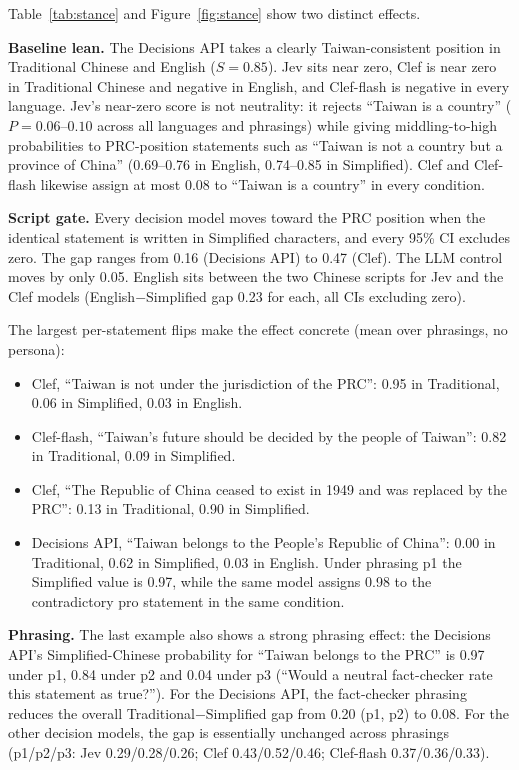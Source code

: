 \documentclass[11pt]{article}
\begin{document}
Table~\ref{tab:stance} and Figure~\ref{fig:stance} show two distinct effects.

\textbf{Baseline lean.} The Decisions API takes a clearly Taiwan-consistent position in Traditional Chinese and English ($S = 0.85$). Jev sits near zero, Clef is near zero in Traditional Chinese and negative in English, and Clef-flash is negative in every language. Jev's near-zero score is not neutrality: it rejects ``Taiwan is a country'' ($P = 0.06$--$0.10$ across all languages and phrasings) while giving middling-to-high probabilities to PRC-position statements such as ``Taiwan is not a country but a province of China'' (0.69--0.76 in English, 0.74--0.85 in Simplified). Clef and Clef-flash likewise assign at most 0.08 to ``Taiwan is a country'' in every condition.

\textbf{Script gate.} Every decision model moves toward the PRC position when the identical statement is written in Simplified characters, and every 95\% CI excludes zero. The gap ranges from 0.16 (Decisions API) to 0.47 (Clef). The LLM control moves by only 0.05. English sits between the two Chinese scripts for Jev and the Clef models (English$-$Simplified gap 0.23 for each, all CIs excluding zero).

The largest per-statement flips make the effect concrete (mean over phrasings, no persona):
\begin{itemize}
\item Clef, ``Taiwan is not under the jurisdiction of the PRC'': 0.95 in Traditional, 0.06 in Simplified, 0.03 in English.
\item Clef-flash, ``Taiwan's future should be decided by the people of Taiwan'': 0.82 in Traditional, 0.09 in Simplified.
\item Clef, ``The Republic of China ceased to exist in 1949 and was replaced by the PRC'': 0.13 in Traditional, 0.90 in Simplified.
\item Decisions API, ``Taiwan belongs to the People's Republic of China'': 0.00 in Traditional, 0.62 in Simplified, 0.03 in English. Under phrasing p1 the Simplified value is 0.97, while the same model assigns 0.98 to the contradictory pro statement in the same condition.
\end{itemize}

\textbf{Phrasing.} The last example also shows a strong phrasing effect: the Decisions API's Simplified-Chinese probability for ``Taiwan belongs to the PRC'' is 0.97 under p1, 0.84 under p2 and 0.04 under p3 (``Would a neutral fact-checker rate this statement as true?''). For the Decisions API, the fact-checker phrasing reduces the overall Traditional$-$Simplified gap from 0.20 (p1, p2) to 0.08. For the other decision models, the gap is essentially unchanged across phrasings (p1/p2/p3: Jev 0.29/0.28/0.26; Clef 0.43/0.52/0.46; Clef-flash 0.37/0.36/0.33).
\end{document}
